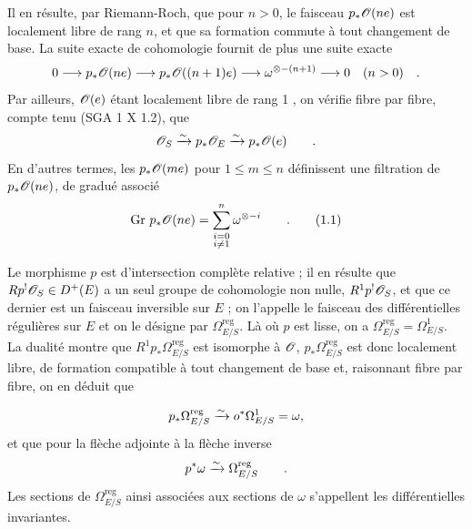 Il en résulte, par Riemann-Roch, que pour $n>0$, le faisceau $p_*\mathscr O(ne)$ est localement libre de rang $n$, et que sa formation commute à tout changement de base. La suite exacte de cohomologie fournit de plus une suite exacte
\[
0\longrightarrow p_*\mathscr O(ne)\longrightarrow
p_*\mathscr O((n+1)e)\longrightarrow\omega^{\otimes-(n+1)}
\longrightarrow0\quad(n>0)\quad .
\]
Par ailleurs, $\mathscr O(e)$ étant localement libre de rang 1 , on vérifie fibre par fibre, compte tenu  (SGA 1 X 1.2), que
\[
\mathscr O_S\xrightarrow{\sim}p_*\mathscr O_E
\xrightarrow{\sim}p_*\mathscr O(e)\qquad .
\]
En d'autres termes, les $p_*\mathscr O(me)$ pour $1\leq m\leq n$ définissent une filtration de $p_*\mathscr O(ne)$, de gradué associé
\[
\mathrm{Gr}\ p_*\handwritten{\mathscr O}(ne)=\sum_{\substack{i=0\\i\ne1}}^n\omega^{\otimes-i}\qquad .\tag*{(1.1)}
\]

Le morphisme $p$ est d'intersection complète relative ; il en résulte que $Rp^!\mathscr O_S\in D^+(E)$  a un seul groupe de cohomologie non nulle, $R^1p^!\mathscr O_S$, et que ce dernier est un faisceau inversible sur $E$ ; on l'appelle le faisceau des différentielles régulières sur $E$ et on le désigne par $\Omega^{\mathrm{reg}}_{E/S}$. Là où $p$ est lisse, on a $\Omega^{\mathrm{reg}}_{E/S}=\Omega^1_{E/S}$. La dualité montre que $R^1p_*\Omega^{\mathrm{reg}}_{E/S}$ est isomorphe à $\mathscr O$, $p_*\Omega^{\mathrm{reg}}_{E/S}$ est donc localement libre, de formation compatible à tout changement de base et, raisonnant fibre par fibre, on en déduit que

\[
p_*\Omega^{\mathrm{reg}}_{E/S}\xrightarrow{\sim}o^*\Omega^1_{E/S}=\omega ,
\]
et que pour la flèche adjointe à la flèche inverse
\[
p^*\omega\xrightarrow{\sim}\Omega^{\mathrm{reg}}_{E/S}\qquad .
\]
Les sections de $\Omega^{\mathrm{reg}}_{E/S}$ ainsi associées aux sections de $\omega$ s'appellent les différentielles invariantes.


